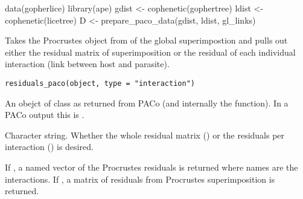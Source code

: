 \documentclass[letterpaper]{book}
\begin{document}
%
\begin{Examples}
\begin{ExampleCode}
data(gopherlice)
library(ape)
gdist <- cophenetic(gophertree)
ldist <- cophenetic(licetree)
D <- prepare_paco_data(gdist, ldist, gl_links)
\end{ExampleCode}
\end{Examples}
%
\begin{Description}\relax
Takes the Procrustes object from  of the global superimpostion and pulls out either the residual matrix of superimposition or the residual of each individual interaction (link between host and parasite).
\end{Description}
%
\begin{Usage}
\begin{verbatim}
residuals_paco(object, type = "interaction")
\end{verbatim}
\end{Usage}
%
\begin{Arguments}
\begin{ldescription}
\item[\code{object}] An obejct of class  as returned from PACo (and internally the  function). In a PACo output this is .

\item[\code{type}] Character string. Whether the whole residual matrix () or the residuals per interaction () is desired.
\end{ldescription}
\end{Arguments}
%
\begin{Value}
If , a named vector of the Procrustes residuals is returned where names are the interactions. If , a matrix of residuals from Procrustes superimposition is returned.
\end{Value}
%
\begin{Examples}
\end{Examples}
\printindex{}
\end{document}
